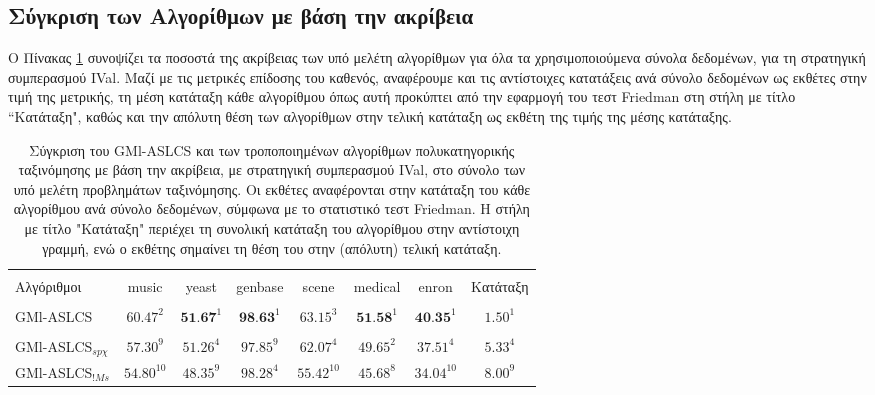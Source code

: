 \subsection{Σύγκριση των Αλγορίθμων με βάση την ακρίβεια}

Ο Πίνακας \ref{table:accuracyBasedComparisonVars} συνοψίζει τα ποσοστά της ακρίβειας των υπό μελέτη αλγορίθμων για όλα τα χρησιμοποιούμενα σύνολα δεδομένων, για τη στρατηγική συμπερασμού IVal. Μαζί με τις μετρικές επίδοσης του καθενός, αναφέρουμε και τις αντίστοιχες κατατάξεις ανά σύνολο δεδομένων ως εκθέτες στην τιμή της μετρικής, τη μέση κατάταξη κάθε αλγορίθμου όπως αυτή προκύπτει από την εφαρμογή του τεστ Friedman στη στήλη με τίτλο “Κατάταξη", καθώς και την απόλυτη θέση των αλγορίθμων στην τελική κατάταξη ως εκθέτη της τιμής της μέσης κατάταξης.

\begin{table}[!h]
\begin{center}
    \caption[Σύγκριση του GMl-ASLCS και των τροποποιημένων αλγορίθμων πολυκατηγορικής ταξινόμησης με βάση την ακρίβεια, με μέθοδο ταξινόμησης IVal, στο σύνολο των υπό μελέτη προβλημάτων ταξινόμησης.] {Σύγκριση του GMl-ASLCS και των τροποποιημένων αλγορίθμων πολυκατηγορικής ταξινόμησης με βάση την ακρίβεια, με στρατηγική συμπερασμού IVal, στο σύνολο των υπό μελέτη προβλημάτων ταξινόμησης. Οι εκθέτες αναφέρονται στην κατάταξη του κάθε αλγορίθμου ανά σύνολο δεδομένων, σύμφωνα με το στατιστικό τεστ Friedman. Η στήλη με τίτλο "Κατάταξη" περιέχει τη συνολική κατάταξη του αλγορίθμου στην αντίστοιχη γραμμή, ενώ ο εκθέτης σημαίνει τη θέση του στην (απόλυτη) τελική κατάταξη.}
	\label{table:accuracyBasedComparisonVars}
    \begin{tabular}{l|cccccc|c}
    \hline \\ [-2ex] 
    Αλγόριθμοι           & music         & yeast        & genbase      & scene   & medical      & enron        & Κατάταξη  \\    \hline \\ [-2ex] 
    GMl-ASLCS            & $60.47^2$     & $\textbf{51.67}^1$    & $\textbf{98.63}^1$    & $63.15^3$ & $\textbf{51.58}^1$    & $\textbf{40.35}^1$    & $1.50^1$        \\ \hline \\ [-2ex]
    GMl-ASLCS$_{sp\chi}$  & $57.30^9$     & $51.26^4$    & $97.85^9$    & $62.07^4$ & $49.65^2$    & $37.51^4$    & $5.33^4$        \\
    GMl-ASLCS$_{!Ms}$    & $54.80^{10}$  & $48.35^9$    & $98.28^4$    & $55.42^{10}$ & $45.68^8$    & $34.04^{10}$ & $8.00^9$          \\

\end{tabular}
\end{center}
\end{table}
